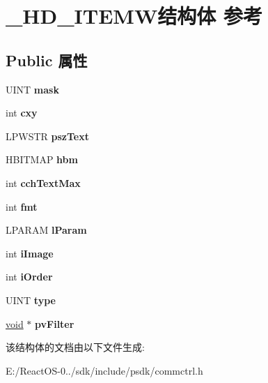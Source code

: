 \hypertarget{struct___h_d___i_t_e_m_w}{}\section{\+\_\+\+H\+D\+\_\+\+I\+T\+E\+M\+W结构体 参考}
\label{struct___h_d___i_t_e_m_w}
\subsection*{Public 属性}
\begin{DoxyCompactItemize}
\item 
\mbox{\label{struct___h_d___i_t_e_m_w_a00970244ae82c4cefa506bae1cb544c9}} 
U\+I\+NT {\bfseries mask}
\item 
\mbox{\label{struct___h_d___i_t_e_m_w_a814b5566a8acca93e4cac3c01674e096}} 
int {\bfseries cxy}
\item 
\mbox{\label{struct___h_d___i_t_e_m_w_a82c96667012f43700ec170e36a6dadd2}} 
L\+P\+W\+S\+TR {\bfseries psz\+Text}
\item 
\mbox{\label{struct___h_d___i_t_e_m_w_a3480ef95220121370fd25692e2a44ac1}} 
H\+B\+I\+T\+M\+AP {\bfseries hbm}
\item 
\mbox{\label{struct___h_d___i_t_e_m_w_af59e302a1357b9f1e288791032d8aed8}} 
int {\bfseries cch\+Text\+Max}
\item 
\mbox{\label{struct___h_d___i_t_e_m_w_a6cfda63f6c429806bd32147064b7c10f}} 
int {\bfseries fmt}
\item 
\mbox{\label{struct___h_d___i_t_e_m_w_a1829f35fc26543fda418987fdf27a298}} 
L\+P\+A\+R\+AM {\bfseries l\+Param}
\item 
\mbox{\label{struct___h_d___i_t_e_m_w_a0f166f37dc70661cb385d479ec055868}} 
int {\bfseries i\+Image}
\item 
\mbox{\label{struct___h_d___i_t_e_m_w_a4ec0f4fbb4916f6757ab73ccb8e8996a}} 
int {\bfseries i\+Order}
\item 
\mbox{\label{struct___h_d___i_t_e_m_w_adb95ec9b8d00d03698c036c1c5d90753}} 
U\+I\+NT {\bfseries type}
\item 
\mbox{\label{struct___h_d___i_t_e_m_w_ae3bd5fee505698090b93af720ecd2588}} 
\hyperlink{interfacevoid}{void} $\ast$ {\bfseries pv\+Filter}
\end{DoxyCompactItemize}


该结构体的文档由以下文件生成\+:\begin{DoxyCompactItemize}
\item 
E\+:/\+React\+O\+S-\/0../sdk/include/psdk/commctrl.\+h\end{DoxyCompactItemize}
